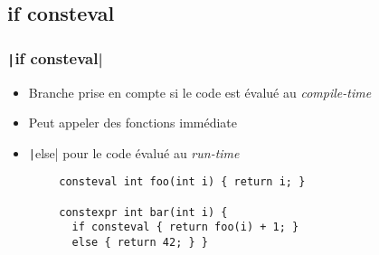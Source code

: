 \documentclass[C++.tex]{subfiles}
\begin{document}
\subsection*{if consteval}
\begin{frame}[fragile]
	\frametitle{\texttt|if consteval|}
	\begin{itemize}
		\item Branche prise en compte si le code est évalué au \textit{compile-time}
		\item Peut appeler des fonctions immédiate


		\item \texttt|else| pour le code évalué au \textit{run-time}
	\end{itemize}

	\begin{verbatim}
		consteval int foo(int i) { return i; }

		constexpr int bar(int i) {
		  if consteval { return foo(i) + 1; }
		  else { return 42; } }
	\end{verbatim}


\end{frame}
\end{document}
